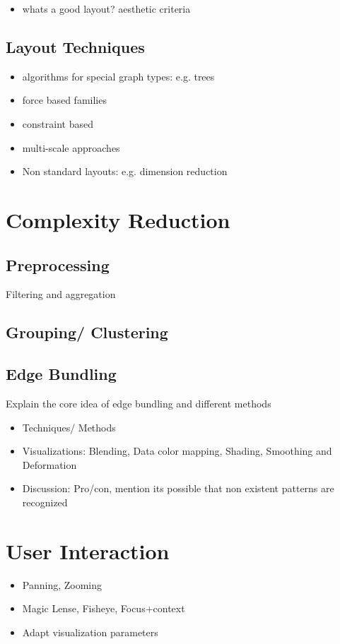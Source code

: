 \begin{itemize}
    \item whats a good layout? aesthetic criteria 
\end{itemize}

\subsection{Layout Techniques}
\begin{itemize}
    \item algorithms for special graph types: e.g. trees 
    \item force based families
    \item constraint based
    \item multi-scale approaches
    \item Non standard layouts: e.g. dimension reduction
\end{itemize}

\section{Complexity Reduction}

\subsection{Preprocessing}
Filtering and aggregation
\subsection{Grouping/ Clustering}

\subsection{Edge Bundling}
Explain the core idea of edge bundling and different methods
\begin{itemize}
    \item Techniques/ Methods
    \item Visualizations: Blending, Data color mapping, Shading, Smoothing and Deformation
    \item Discussion: Pro/con, mention its possible that non existent patterns are recognized
\end{itemize}

\section{User Interaction}
\begin{itemize}
    \item Panning, Zooming
    \item Magic Lense, Fisheye, Focus+context
    \item Adapt visualization parameters
\end{itemize}

